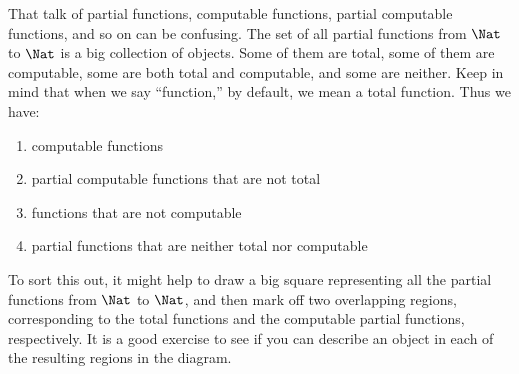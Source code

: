 \documentclass[../../../include/open-logic-section]{subfiles}
\begin{document}
That talk of partial functions, computable functions,
partial computable functions, and so on can be confusing. The set of
all partial functions from $\Nat$ to $\Nat$ is a big collection of
objects. Some of them are total, some of them are computable, some are
both total and computable, and some are neither. Keep in mind that
when we say ``function,'' by default, we mean a total function. Thus we
have:
\begin{enumerate}
\item computable functions
\item partial computable functions that are not total
\item functions that are not computable
\item partial functions that are neither total nor computable
\end{enumerate}
To sort this out, it might help to draw a big square representing all
the partial functions from $\Nat$ to $\Nat$, and then mark off two
overlapping regions, corresponding to the total functions and the
computable partial functions, respectively. It is a good exercise to
see if you can describe an object in each of the resulting regions in
the diagram.
\end{document}
